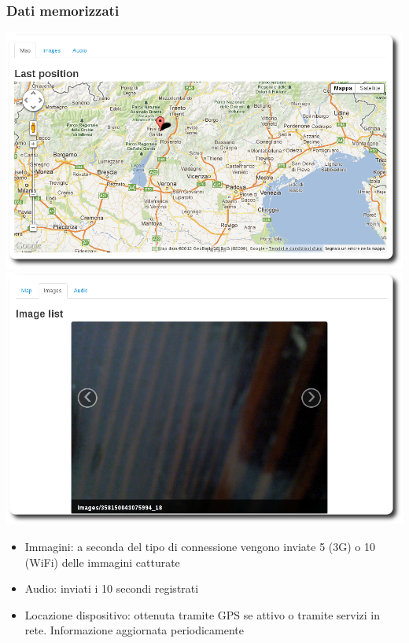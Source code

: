 \documentclass{beamer}
\begin{document}
\begin{frame}
\frametitle{Dati memorizzati}
\begin{center}
\includegraphics[scale=.15]{./img/map.png}
\includegraphics[scale=.15]{./img/slideshow.png}
\end{center}
\begin{itemize}
  \item Immagini: a seconda del tipo di connessione vengono inviate 5 (3G) o 10 (WiFi) delle immagini catturate
  \item Audio: inviati i 10 secondi registrati
  \item Locazione dispositivo: ottenuta tramite GPS se attivo o tramite servizi in rete. Informazione aggiornata periodicamente
\end{itemize}
\end{frame}
\end{document}
